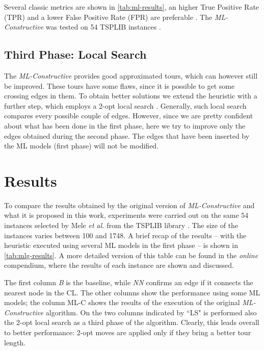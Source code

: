 \documentclass{article}
\begin{document}
\vspace{5 pt}

Several classic metrics are shown in \autoref{tab:ml-results}, an higher True Positive Rate (TPR) and a lower False Positive Rate (FPR) are preferable \cite{mele:gambardella:montemanni}.
The \emph{ML-Constructive} was tested on 54 TSPLIB instances \cite{reinelt}. 


\subsection{Third Phase: Local Search} \label{2opt}
The \emph{ML-Constructive} provides good approximated tours, which can however still be improved.
These tours have some flaws, since it is possible to get some crossing edges in them. 
To obtain better solutions we extend the heuristic with a further step, which employs a 2-opt local search \cite{local_search}.
Generally, such local search compares every possible couple of edges.
However, since we are pretty confident about what has been done in the first phase, here we try to improve only the edges obtained during the second phase.
The edges that have been inserted by the ML models (first phase)
will not be modified. 








\section{Results} \label{results}

To compare the results obtained by the original version of \textit{ML-Constructive} \cite{mele:gambardella:montemanni} and what it is proposed in this work, experiments were carried out on the same 54 instances selected by Mele \emph{et al.} 
\cite{mele:gambardella:montemanni} 
from the TSPLIB library \cite{reinelt}. 
The size of the instances varies between 100 and 1748. A brief recap of the results -- with the heuristic executed using several ML models in the first phase -- is shown in \autoref{tab:mlg-results}. 
A more detailed version of this table can be found in the \emph{online} compendium, where the results of each instance are shown and discussed.

The first column \textit{B} is the baseline, while \textit{NN} confirms an edge if it connects the nearest node in the CL.
The other columns show the performance using some ML models; the column ML-C shows the results of the execution of the original \emph{ML-Constructive} algorithm. 
On the two columns indicated by ``LS" is performed also the 2-opt local search as a third phase of the algorithm. Clearly, this leads overall to better performance: 2-opt moves are applied only if they bring a better tour length.
\end{document}
